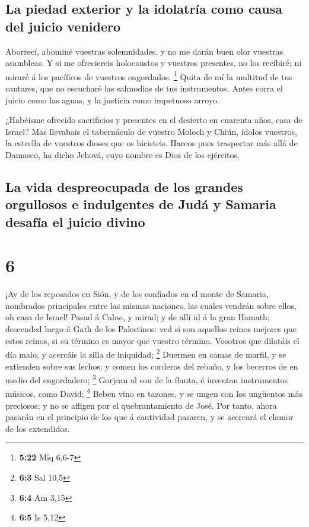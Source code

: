 \hypertarget{la-piedad-exterior-y-la-idolatruxeda-como-causa-del-juicio-venidero}{%
\subsection{La piedad exterior y la idolatría como causa del juicio
venidero}\label{la-piedad-exterior-y-la-idolatruxeda-como-causa-del-juicio-venidero}}

 Aborrecí, abominé vuestras solemnidades, y no me darán
buen olor vuestras asambleas.  Y si me ofreciereis
holocaustos y vuestros presentes, no los recibiré; ni miraré á los
pacíficos de vuestros engordados. \footnote{\textbf{5:22} Miq 6,6-7}
 Quita de mí la multitud de tus cantares, que no escucharé
las salmodias de tus instrumentos.  Antes corra el juicio
como las aguas, y la justicia como impetuoso arroyo.

 ¿Habéisme ofrecido sacrificios y presentes en el desierto
en cuarenta años, casa de Israel?  Mas llevabais el
tabernáculo de vuestro Moloch y Chiún, ídolos vuestros, la estrella de
vuestros dioses que os hicisteis.  Hareos pues trasportar
más allá de Damasco, ha dicho Jehová, cuyo nombre es Dios de los
ejércitos.

\hypertarget{la-vida-despreocupada-de-los-grandes-orgullosos-e-indulgentes-de-juduxe1-y-samaria-desafuxeda-el-juicio-divino}{%
\subsection{La vida despreocupada de los grandes orgullosos e
indulgentes de Judá y Samaria desafía el juicio
divino}\label{la-vida-despreocupada-de-los-grandes-orgullosos-e-indulgentes-de-juduxe1-y-samaria-desafuxeda-el-juicio-divino}}

\hypertarget{section-5}{%
\section{6}\label{section-5}}

 ¡Ay de los reposados en Sión, y de los confiados en el
monte de Samaria, nombrados principales entre las mismas naciones, las
cuales vendrán sobre ellos, oh casa de Israel!  Pasad á
Calne, y mirad; y de allí id á la gran Hamath; descended luego á Gath de
los Palestinos: ved si son aquellos reinos mejores que estos reinos, si
su término es mayor que vuestro término.  Vosotros que
dilatáis el día malo, y acercáis la silla de iniquidad; \footnote{\textbf{6:3}
  Sal 10,5}  Duermen en camas de marfil, y se extienden
sobre sus lechos; y comen los corderos del rebaño, y los becerros de en
medio del engordadero; \footnote{\textbf{6:4} Am 3,15} 
Gorjean al son de la flauta, é inventan instrumentos músicos, como
David; \footnote{\textbf{6:5} Is 5,12}  Beben vino en
tazones, y se ungen con los ungüentos más preciosos; y no se afligen por
el quebrantamiento de José.  Por tanto, ahora pasarán en el
principio de los que á cautividad pasaren, y se acercará el clamor de
los extendidos.

